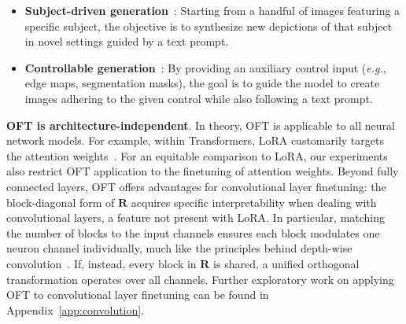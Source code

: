\begin{itemize}[leftmargin=*,nosep]
\begin{equation}\label{eq:oft_general}
    \footnotesize
    \bm{z}=\bm{W}^\top\bm{x}=(\bm{R}\cdot\bm{W}^0)^\top\bm{x},~~~\text{s.t.}~\bm{R}^\top\bm{R}=\bm{R}\bm{R}^\top=\bm{I}
\end{equation}

However, OFT presents several intriguing unresolved questions. Firstly, orthogonality within OFT is maintained using Cayley parametrization, a technique that necessitates matrix inversion, slightly restricting the approach’s scalability. We partially mitigate this constraint by leveraging block diagonal parametrization; nevertheless, discovering efficient, differentiable methods for matrix inversion remains an open challenge. Secondly, OFT is particularly promising for compositionality: orthogonal matrices generated from different OFT finetuning processes can be multiplied to yield another orthogonal matrix. A worthwhile direction for future exploration is whether such a collection of orthogonal matrices can simultaneously preserve the distinct knowledge from all the respective downstream tasks. Lastly, OFT's parameter efficiency is intimately tied to its block diagonal parameterization, which can introduce structural biases and reduce modeling flexibility. Enhancing parameter efficiency with methods that are more adaptive and introduce less bias is an open research avenue of significant interest.

    \item \textbf{Subject-driven generation}~\cite{ruiz2023dreambooth}: Starting from a handful of images featuring a specific subject, the objective is to synthesize new depictions of that subject in novel settings guided by a text prompt.
    \item \textbf{Controllable generation}~\cite{zhang2023adding,mou2023t2i}: By providing an auxiliary control input (\emph{e.g.}, edge maps, segmentation masks), the goal is to guide the model to create images adhering to the given control while also following a text prompt.
\end{itemize}

\textbf{OFT is architecture-independent}. In theory, OFT is applicable to all neural network models. For example, within Transformers, LoRA customarily targets the attention weights~\cite{hulora2022}. For an equitable comparison to LoRA, our experiments also restrict OFT application to the finetuning of attention weights. Beyond fully connected layers, OFT offers advantages for convolutional layer finetuning: the block-diagonal form of $\bm{R}$ acquires specific interpretability when dealing with convolutional layers, a feature not present with LoRA. In particular, matching the number of blocks to the input channels ensures each block modulates one neuron channel individually, much like the principles behind depth-wise convolution~\cite{chollet2017xception}. If, instead, every block in $\bm{R}$ is shared, a unified orthogonal transformation operates over all channels. Further exploratory work on applying OFT to convolutional layer finetuning can be found in Appendix~\ref{app:convolution}.

